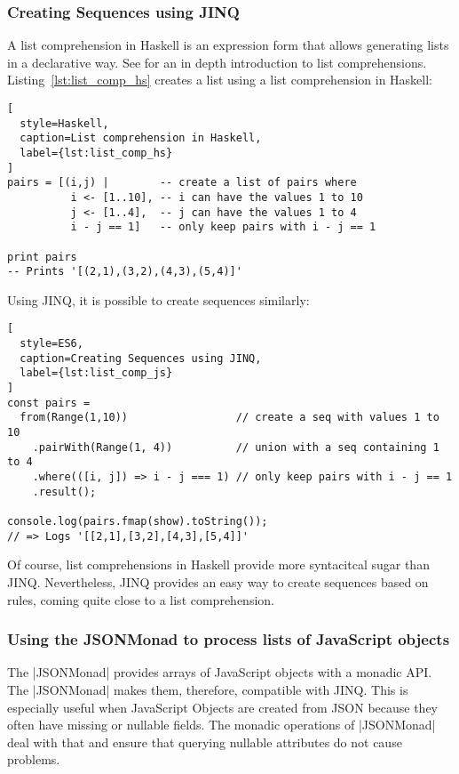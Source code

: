 \subsubsection{Creating Sequences using JINQ} %
\label{subsub:Creating Sequences using JINQ}
A list comprehension in Haskell is an expression form that allows generating
lists in a declarative way. See \cite[Chapter 5]{hutton_pih_2016} for an
in depth introduction to list comprehensions. \\
Listing~\ref{lst:list_comp_hs} creates a list using a list comprehension in
Haskell:

\begin{lstlisting}[
  style=Haskell,
  caption=List comprehension in Haskell,
  label={lst:list_comp_hs}
]
pairs = [(i,j) |        -- create a list of pairs where
          i <- [1..10], -- i can have the values 1 to 10
          j <- [1..4],  -- j can have the values 1 to 4
          i - j == 1]   -- only keep pairs with i - j == 1

print pairs
-- Prints '[(2,1),(3,2),(4,3),(5,4)]'
\end{lstlisting}

Using JINQ, it is possible to create sequences similarly:
\begin{lstlisting}[
  style=ES6,
  caption=Creating Sequences using JINQ,
  label={lst:list_comp_js}
]
const pairs =
  from(Range(1,10))                 // create a seq with values 1 to 10
    .pairWith(Range(1, 4))          // union with a seq containing 1 to 4
    .where(([i, j]) => i - j === 1) // only keep pairs with i - j == 1
    .result();

console.log(pairs.fmap(show).toString());
// => Logs '[[2,1],[3,2],[4,3],[5,4]]'
\end{lstlisting}

Of course, list comprehensions in Haskell provide more syntacitcal sugar than
JINQ. Nevertheless, JINQ provides an easy way to create sequences based on
rules, coming quite close to a list comprehension.

\subsubsection{Using the JSONMonad to process lists of JavaScript objects} %
\label{subsub:Using the JSONMonad to process lists of JavaScript objects}
The |JSONMonad| provides arrays of JavaScript objects with a monadic API. The
|JSONMonad| makes them, therefore, compatible with JINQ. This is especially
useful when JavaScript Objects are created from JSON because they often have
missing or nullable fields. The monadic operations of |JSONMonad| deal with
that and ensure that querying nullable attributes do not cause problems.

